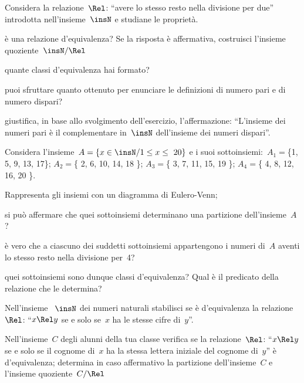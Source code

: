 \begin{multicols}{2}
\begin{esercizio}
\label{ese:B.34}
Considera la relazione~$\Rel$: 
``avere lo stesso resto nella divisione per due'' 
introdotta nell'insieme~$\insN$ e studiane le proprietà.
\begin{itemize*}
\item è una relazione d'equivalenza? Se la risposta è affermativa, costruisci 
 l'insieme quoziente~$\insN/\Rel$
\item quante classi d'equivalenza hai formato?
\item puoi sfruttare quanto ottenuto per enunciare le definizioni di numero 
 pari e di numero dispari?
\item giustifica, in base allo svolgimento dell'esercizio, l'affermazione: 
``L'insieme dei numeri pari è il complementare in~$\insN$ dell'insieme dei 
numeri dispari''.
\end{itemize*}
\end{esercizio}

\begin{esercizio}
\label{ese:B.35}
Considera l'insieme~$A = \{ x \in \insN / 1 \leq x \leq~20 \}$ e i suoi
sottoinsiemi:~$A_1 =$\{1, 5, 9, 13, 17\}; $A_2 =$\{ 2, 6, 10, 14, 18 \}; 
$A_3 =$\{ 3, 7, 11, 15, 19 \}; $A_4 =$\{ 4, 8, 12, 16, 20 \}.
\begin{enumeratea}
\item Rappresenta gli insiemi con un diagramma di Eulero-Venn;
\item si può affermare che quei sottoinsiemi determinano una partizione 
 dell'insieme~$A$?
\item è vero che a ciascuno dei suddetti sottoinsiemi appartengono i numeri 
 di~$A$ aventi lo stesso resto nella divisione per~4?
\item quei sottoinsiemi sono dunque classi d'equivalenza? 
 Qual è il predicato della relazione che le determina?
\end{enumeratea}
\end{esercizio}

\begin{esercizio}
\label{ese:B.36}
Nell'insieme ~$\insN$ dei numeri naturali stabilisci se è d'equivalenza la 
relazione~$\Rel$: ``$x \Rel y$ se e solo se~$x$ ha le stesse cifre di~$y$''.
\end{esercizio}

\begin{esercizio}
\label{ese:B.37}
Nell'insieme~$C$ degli alunni della tua classe verifica se la 
relazione~$\Rel$: ``$x \Rel y$ se e solo se il cognome di~$x$ ha la stessa 
lettera iniziale del cognome di~$y$'' è d'equivalenza; determina in caso 
affermativo la partizione dell'insieme~$C$ e l'insieme quoziente~$C/\Rel$
\end{esercizio}


\end{multicols}
